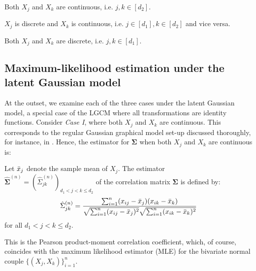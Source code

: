 \begin{description}[labelwidth=4em,leftmargin =\dimexpr\labelwidth+\labelsep\relax, font=\mdseries]
    \item[\textit{Case I}:] Both $X_j$ and $X_k$ are continuous, i.e. $j,k \in [d_2]$.
    \item[\textit{Case II}:] $X_j$ is discrete and $X_k$ is continuous, i.e. \(j\in [d_1], k\in [d_2]\) and vice versa.
    \item[\textit{Case III}:] Both $X_j$ and $X_k$ are discrete, i.e. $j,k \in [d_1]$.
\end{description}

\subsection{Maximum-likelihood estimation under the latent Gaussian model}\label{sec::latent_gaussian}

At the outset, we examine each of the three cases under the latent Gaussian model, a special case of the LGCM where all transformations are identity functions. Consider \textit{Case I}, where both $X_j$ and $X_k$ are continuous. This corresponds to the regular Gaussian graphical model set-up discussed thoroughly, for instance, in \cite{Ravikumar11}. Hence, the estimator for $\mathbf\Sigma$ when both $X_j$ and $X_k$ are continuous is:
\begin{definition}\label{def1}
    Let $\Bar{x}_j$ denote the sample mean of $X_j$. The estimator $\hat{\mathbf{\Sigma}}^{(n)} = (\hat{\Sigma}_{jk}^{(n)})_{d_1 < j < k\leq d_2}$ of the correlation matrix $\mathbf{\Sigma}$ is defined by:
    \begin{equation}
        \hat{\Sigma}_{jk}^{(n)} = \frac{\sum_{i=1}^n(x_{ij}- \Bar{x}_j)(x_{ik}- \Bar{x}_k)}{\sqrt{\sum_{i=1}^n(x_{ij}- \Bar{x}_j)^2} \sqrt{\sum_{i=1}^n(x_{ik}- \Bar{x}_k)^2}}
    \end{equation}
    for all $d_1 < j < k \leq d_2$.
\end{definition}
This is the Pearson product-moment correlation coefficient, which, of course, coincides with the maximum likelihood estimator (MLE) for the bivariate normal couple $\{(X_j, X_k)\}_{i=1}^n$.


